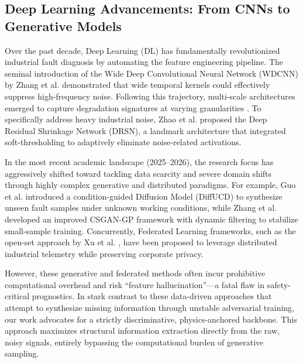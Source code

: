 \documentclass[5p,times,twocolumn]{elsarticle}
\begin{document}
\subsection{Deep Learning Advancements: From CNNs to Generative Models}
Over the past decade, Deep Learning (DL) has fundamentally revolutionized industrial fault diagnosis by automating the feature engineering pipeline. The seminal introduction of the Wide Deep Convolutional Neural Network (WDCNN) by Zhang et al. \cite{P21_Zhang} demonstrated that wide temporal kernels could effectively suppress high-frequency noise. Following this trajectory, multi-scale architectures emerged to capture degradation signatures at varying granularities \cite{P34_Huang, P16_Zhu}. To specifically address heavy industrial noise, Zhao et al. \cite{P20_Zhao} proposed the Deep Residual Shrinkage Network (DRSN), a landmark architecture that integrated soft-thresholding to adaptively eliminate noise-related activations.

In the most recent academic landscape (2025--2026), the research focus has aggressively shifted toward tackling data scarcity and severe domain shifts through highly complex generative and distributed paradigms. For example, Guo et al. \cite{Ref_Guo_DiffUCD} introduced a condition-guided Diffusion Model (DiffUCD) to synthesize unseen fault samples under unknown working conditions, while Zhang et al. \cite{Ref_Zhang_GAN} developed an improved CSGAN-GP framework with dynamic filtering to stabilize small-sample training. Concurrently, Federated Learning frameworks, such as the open-set approach by Xu et al. \cite{Ref_Xu_MSSP_2026}, have been proposed to leverage distributed industrial telemetry while preserving corporate privacy. 

However, these generative and federated methods often incur prohibitive computational overhead and risk ``feature hallucination''—a fatal flaw in safety-critical prognostics. In stark contrast to these data-driven approaches that attempt to synthesize missing information through unstable adversarial training, our work advocates for a strictly discriminative, physics-anchored backbone. This approach maximizes structural information extraction directly from the raw, noisy signals, entirely bypassing the computational burden of generative sampling.
\end{document}
